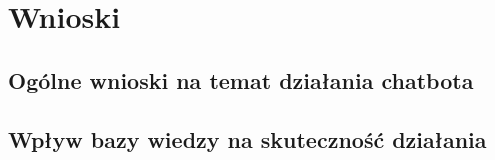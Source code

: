 \chapter{Wnioski}

\section{Ogólne wnioski na temat działania chatbota}

\section{Wpływ bazy wiedzy na skuteczność działania}
